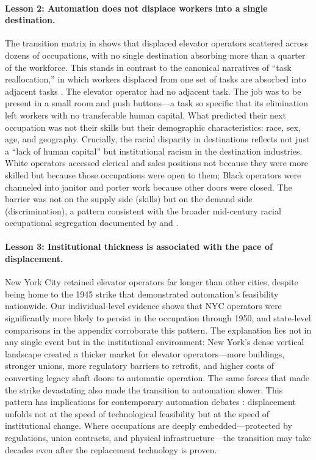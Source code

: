 \documentclass[12pt]{article}
\begin{document}
\paragraph{Lesson 2: Automation does not displace workers into a single destination.} The transition matrix in  shows that displaced elevator operators scattered across dozens of occupations, with no single destination absorbing more than a quarter of the workforce. This stands in contrast to the canonical narratives of ``task reallocation,'' in which workers displaced from one set of tasks are absorbed into adjacent tasks \citep{acemoglu2019, autor2024}. The elevator operator had no adjacent task. The job was to be present in a small room and push buttons---a task so specific that its elimination left workers with no transferable human capital. What predicted their next occupation was not their skills but their demographic characteristics: race, sex, age, and geography. Crucially, the racial disparity in destinations reflects not just a ``lack of human capital'' but institutional racism in the destination industries. White operators accessed clerical and sales positions not because they were more skilled but because those occupations were open to them; Black operators were channeled into janitor and porter work because other doors were closed. The barrier was not on the supply side (skills) but on the demand side (discrimination), a pattern consistent with the broader mid-century racial occupational segregation documented by \citet{derenoncourt2022} and \citet{collins2022}.

\paragraph{Lesson 3: Institutional thickness is associated with the pace of displacement.} New York City retained elevator operators far longer than other cities, despite being home to the 1945 strike that demonstrated automation's feasibility nationwide. Our individual-level evidence shows that NYC operators were significantly more likely to persist in the occupation through 1950, and state-level comparisons in the appendix corroborate this pattern. The explanation lies not in any single event but in the institutional environment: New York's dense vertical landscape created a thicker market for elevator operators---more buildings, stronger unions, more regulatory barriers to retrofit, and higher costs of converting legacy shaft doors to automatic operation. The same forces that made the strike devastating also made the transition to automation slower. This pattern has implications for contemporary automation debates \citep{acemoglu2020, seamans2024}: displacement unfolds not at the speed of technological feasibility but at the speed of institutional change. Where occupations are deeply embedded---protected by regulations, union contracts, and physical infrastructure---the transition may take decades even after the replacement technology is proven.
\end{document}
